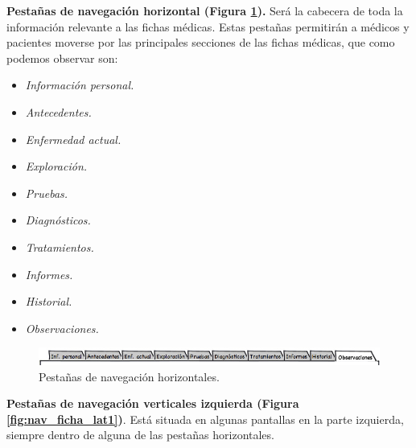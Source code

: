 \documentclass[a4paper,oneside,11pt]{book}
\begin{document}
		\textbf{Pestañas de navegación horizontal (Figura \ref{fig:nav_ficha_sup1}).} Será la cabecera de toda la información relevante a las fichas médicas. Estas pestañas permitirán a médicos y pacientes moverse por las principales secciones de las fichas médicas, que como podemos observar son:
		\begin{itemize}
			\item \textit{Información personal.} 
			\item \textit{Antecedentes.}     
			\item \textit{Enfermedad actual.}
			\item \textit{Exploración.}
			\item \textit{Pruebas.}
			\item \textit{Diagnósticos.}     
			\item \textit{Tratamientos.}
			\item \textit{Informes.}
			\item \textit{Historial.}
			\item \textit{Observaciones.}     
		\end{itemize}
		
		
		\begin{figure}[H]
		  \centering
		    \includegraphics[width=15cm]{img/jpg/nav/fichamedica_sup.jpg}
		  \caption{Pestañas de navegación horizontales.}
		  \label{fig:nav_ficha_sup1}
		\end{figure}
		
		\textbf{Pestañas de navegación verticales izquierda (Figura \ref{fig:nav_ficha_lat1})}. Está situada en algunas pantallas en la parte izquierda, siempre dentro de alguna de las pestañas horizontales.
		
		
\end{document}
